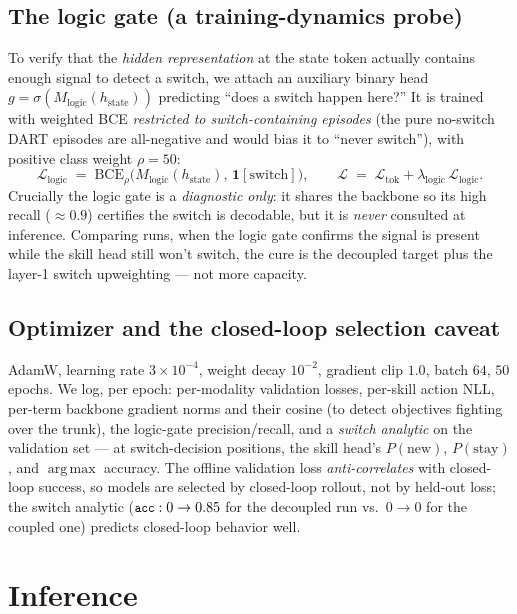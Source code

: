 \documentclass[11pt]{article}
\newcommand{\argmax}{\operatorname*{arg\,max}}
\newcommand{\code}[1]{\texttt{\small #1}}
\begin{document}
\subsection{The logic gate (a training-dynamics probe)}
To verify that the \emph{hidden representation} at the state token actually contains
enough signal to detect a switch, we attach an auxiliary binary head
$g=\sigma(M_{\mathrm{logic}}(h_{\mathrm{state}}))$ predicting ``does a switch happen
here?'' It is trained with weighted BCE \emph{restricted to switch-containing
episodes} (the pure no-switch DART episodes are all-negative and would bias it to
``never switch''), with positive class weight $\rho=50$:
\begin{equation}
\mathcal{L}_{\mathrm{logic}} \;=\;
\mathrm{BCE}_{\rho}\!\big(M_{\mathrm{logic}}(h_{\mathrm{state}}),\,
\mathbf{1}[\text{switch}]\big),
\qquad
\mathcal{L} \;=\; \mathcal{L}_{\mathrm{tok}} + \lambda_{\mathrm{logic}}\,
\mathcal{L}_{\mathrm{logic}}.
\end{equation}
Crucially the logic gate is a \emph{diagnostic only}: it shares the backbone so its
high recall ($\approx0.9$) certifies the switch is decodable, but it is \emph{never}
consulted at inference. Comparing runs, when the logic gate confirms the signal is
present while the skill head still won't switch, the cure is the decoupled target plus
the layer-1 switch upweighting --- not more capacity.

\subsection{Optimizer and the closed-loop selection caveat}
AdamW, learning rate $3\!\times\!10^{-4}$, weight decay $10^{-2}$, gradient clip $1.0$,
batch $64$, $50$ epochs. We log, per epoch: per-modality validation losses, per-skill
action NLL, per-term backbone gradient norms and their cosine (to detect objectives
fighting over the trunk), the logic-gate precision/recall, and a \emph{switch
analytic} on the validation set --- at switch-decision positions, the skill head's
$P(\text{new})$, $P(\text{stay})$, and $\argmax$ accuracy. The offline validation loss
\emph{anti-correlates} with closed-loop success, so models are selected by closed-loop
rollout, not by held-out loss; the switch analytic ($\code{acc}:0\to0.85$ for the
decoupled run vs.\ $0\to0$ for the coupled one) predicts closed-loop behavior well.

\section{Inference}
\label{sec:inference}
\end{document}
